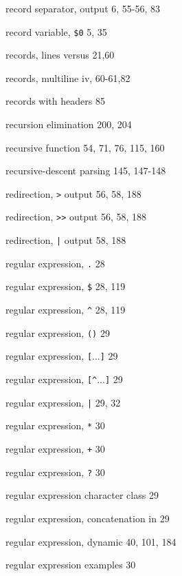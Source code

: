\begin{multicols}{3}
\hangindent=4pc  record separator, output 6, 55-56, 83

\hangindent=4pc  record variable, \verb'$0' 5, 35

\hangindent=4pc  records, lines versus 21,60

\hangindent=4pc  records, multiline iv, 60-61,82

\hangindent=4pc  records with headers 85

\hangindent=4pc  recursion elimination 200, 204

\hangindent=4pc  recursive function 54, 71, 76, 115, 160

\hangindent=4pc  recursive-descent parsing 145, 147-148

\hangindent=4pc  redirection, \verb'>' output 56, 58, 188

\hangindent=4pc  redirection, \verb'>>' output 56, 58, 188

\hangindent=4pc  redirection, \verb'|' output 58, 188

\hangindent=4pc  regular expression, \verb'.' 28

\hangindent=4pc  regular expression, \verb'$' 28, 119

\hangindent=4pc  regular expression, \verb'^' 28, 119

\hangindent=4pc  regular expression, \verb'()' 29

\hangindent=4pc  regular expression, \verb'['...\verb']' 29

\hangindent=4pc  regular expression, \verb'[^'...\verb']' 29

\hangindent=4pc  regular expression, \verb'|' 29, 32

\hangindent=4pc  regular expression, \verb'*' 30

\hangindent=4pc  regular expression, \verb'+' 30

\hangindent=4pc  regular expression, \verb'?' 30

\hangindent=4pc  regular expression character class 29

\hangindent=4pc  regular expression, concatenation in 29

\hangindent=4pc  regular expression, dynamic 40, 101, 184

\hangindent=4pc  regular expression examples 30


\end{multicols}

